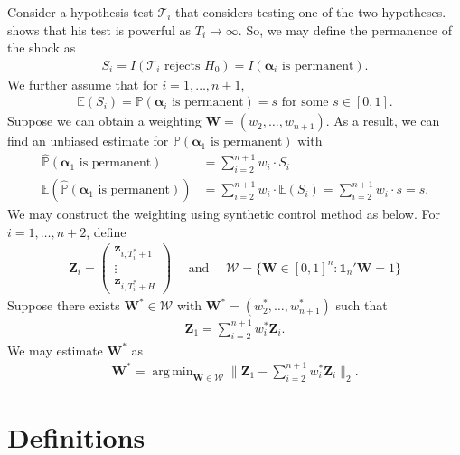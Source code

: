 \documentclass[12pt]{article}
\def\mbf#1{\mathbf{#1}} %
\def\mc#1{\mathcal{#1}} %
\DeclareMathOperator*{\argmin}{arg\,min} %
\def\E{\mathbb{E}} %
\def\mc#1{\mathcal{#1}}
\def\bs#1{\boldsymbol{#1}}
\def\P{\mathbb{P}}
\theoremstyle{definition}
\theoremstyle{definition}
\begin{document}
Consider a hypothesis test $\mc{T}_i$ that considers testing one of the two hypotheses.  \cite{quaedvlieg2021multi} shows that his test is powerful as $T_i \to \infty$. So, we may define the permanence of the shock as
\begin{align*}
  S_i = I(\mc{T}_i \text{ rejects }H_0)= I(\bs{\alpha}_i \text{ is permanent}).
\end{align*}
We further assume that for $i = 1, \ldots, n+1$,
\begin{align*}
  \E (S_i) = \P(\bs{\alpha}_i \text{ is permanent})=s
\text{ for some } s\in [0,1].
\end{align*}
Suppose we can obtain a weighting $\mathbf{W} = (w_2, \ldots, w_{n+1})$. As a result, we can find an unbiased estimate for $ \P(\bs{\alpha}_1 \text{ is permanent})$ with
\begin{align*}
\hat{ \P}(\bs{\alpha}_1 \text{ is permanent})
  &= \sum_{i=2}^{n+1} w_i \cdot S_i \\
 \E ( \hat{ \P}(\bs{\alpha}_1 \text{ is permanent}))
 &= 
 \sum_{i=2}^{n+1} w_i\cdot  \E (S_i)= \sum_{i=2}^{n+1} w_i \cdot  s = s.
\end{align*}
We may construct the weighting using synthetic control method as below. 
For $i=1, \ldots, n+2$, define  
\begin{align*}
  \mathbf{Z}_{i} 
  = \begin{pmatrix}
    \mbf{z}_{i, T_i^*+1} \\ 
    \vdots \\
    \mbf{z}_{i, T_i^*+H}
  \end{pmatrix}
  \quad 
  \text{ and } \quad 
  \mc{W}=\{\mathbf{W}\in [0,1]^n \colon \mathbf{1}_n'\mathbf{W}=1\}
\end{align*}
Suppose there exists $\mathbf{W}^*\in \mc{W}$ with $\mathbf{W}^* = (w_{2}^*, \ldots, w_{n+1}^*)$ such that
\begin{align*}
  \mathbf{Z}_1 = \sum_{i=2}^{n+1} w_i^* \mathbf{Z}_{i}.
\end{align*}
We may estimate $\mathbf{W}^*$ as
\begin{align*}
  \mathbf{W}^* 
  = \argmin_{\mathbf{W}\in \mc{W}}
  \|  \mathbf{Z}_1-\sum_{i=2}^{n+1} w_i^* \mathbf{Z}_{i} \|_2.
\end{align*}





\section{Definitions}
\end{document}
